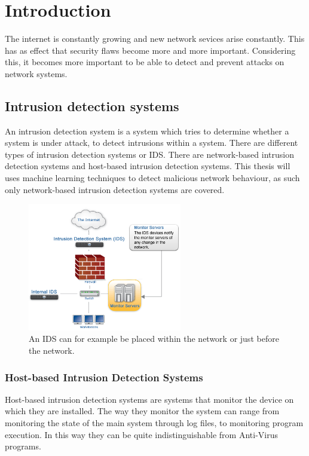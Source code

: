 
\chapter{Introduction} %

\label{Chapter1} %

The internet is constantly growing and new network sevices arise constantly. This has as effect that security flaws become more and more important. Considering this, it becomes more important to be able to detect and prevent attacks on network systems.

\section{Intrusion detection systems}
An intrusion detection system is a system which tries to determine whether a system is under attack, to detect intrusions within a system. There are different types of intrusion detection systems or IDS. There are network-based intrusion detection systems and host-based intrusion detection systems. This thesis will uses machine learning techniques to detect malicious network behaviour, as such only network-based intrusion detection systems are covered.
\begin{figure}[H]
\centering
\includegraphics[width=0.6\textwidth]{Figures/idsdiagram}
\decoRule
\caption[Possible placement of IDS]{An IDS can for example be placed within the network or just before the network.}
\label{fig:Signature}
\end{figure}
\subsection{Host-based Intrusion Detection Systems}
Host-based intrusion detection systems are systems that monitor the device on which they are installed. The way they monitor the system can range from monitoring the state of the main system through log files, to monitoring program execution. In this way they can be quite indistinguishable from Anti-Virus programs.

